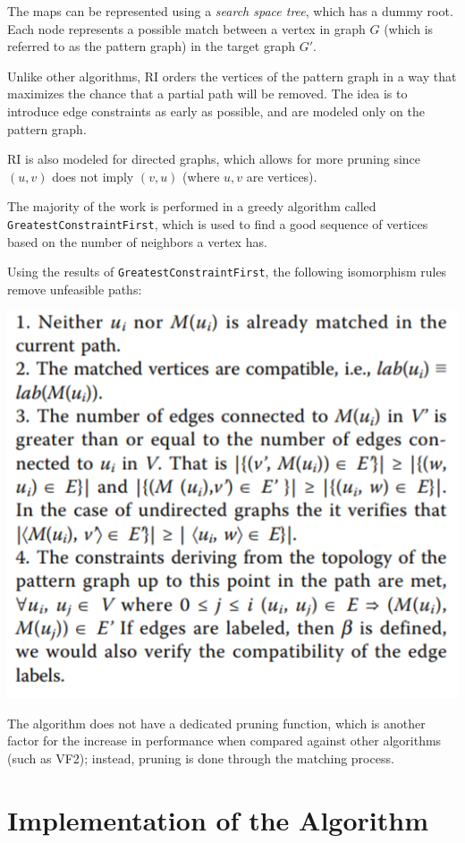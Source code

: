 \documentclass{article}
\begin{document}
  The maps can be represented using a \textit{search space tree}, which has a dummy root. Each node represents a possible match between a vertex in graph $G$ (which is referred to as the pattern graph) in the target graph $G'$.

  Unlike other algorithms, RI orders the vertices of the pattern graph in a way that maximizes the chance that a partial path will be removed. The idea is to introduce edge constraints as early as possible, and are modeled only on the pattern graph.

  RI is also modeled for directed graphs, which allows for more pruning since $(u,v)$ does not imply $(v, u)$ (where $u, v$ are vertices).

  The majority of the work is performed in a greedy algorithm called \texttt{GreatestConstraintFirst}, which is used to find a good sequence of vertices based on the number of neighbors a vertex has.

  Using the results of \texttt{GreatestConstraintFirst}, the following isomorphism rules remove unfeasible paths:

  \includegraphics{images/ri_rules.png}

  The algorithm does not have a dedicated pruning function, which is another factor for the increase in performance when compared against other algorithms (such as VF2); instead, pruning is done through the matching process.\cite{bonnici}

\section{Implementation of the Algorithm}
\end{document}
